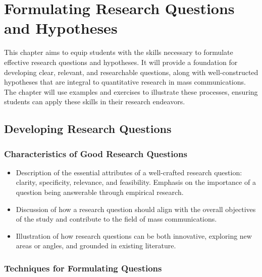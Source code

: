 \documentclass[
]{book}
\begin{document}
\hypertarget{formulating-research-questions-and-hypotheses}{%
\chapter*{Formulating Research Questions and Hypotheses}\label{formulating-research-questions-and-hypotheses}}

This chapter aims to equip students with the skills necessary to formulate effective research questions and hypotheses. It will provide a foundation for developing clear, relevant, and researchable questions, along with well-constructed hypotheses that are integral to quantitative research in mass communications. The chapter will use examples and exercises to illustrate these processes, ensuring students can apply these skills in their research endeavors.

\hypertarget{developing-research-questions}{%
\section*{Developing Research Questions}\label{developing-research-questions}}

\hypertarget{characteristics-of-good-research-questions}{%
\subsection*{Characteristics of Good Research Questions}\label{characteristics-of-good-research-questions}}

\begin{itemize}
\item
  Description of the essential attributes of a well-crafted research question: clarity, specificity, relevance, and feasibility. Emphasis on the importance of a question being answerable through empirical research.
\item
  Discussion of how a research question should align with the overall objectives of the study and contribute to the field of mass communications.
\item
  Illustration of how research questions can be both innovative, exploring new areas or angles, and grounded in existing literature.
\end{itemize}

\hypertarget{techniques-for-formulating-questions}{%
\subsection*{Techniques for Formulating Questions}\label{techniques-for-formulating-questions}}
\end{document}
